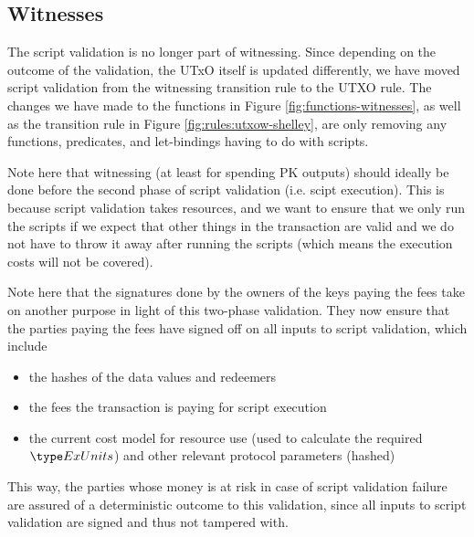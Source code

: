 \clearpage


\subsection{Witnesses}
\label{sec:witnesses-shelley}

The script validation is no longer part of witnessing. Since depending on
the outcome of the validation, the UTxO itself is updated differently, we
have moved script validation from the witnessing transition rule to
the UTXO rule. The changes we have made to the functions in Figure
\ref{fig:functions-witnesses}, as well as the transition rule in Figure
\ref{fig:rules:utxow-shelley}, are only removing any
functions, predicates, and let-bindings having to do with scripts.

Note here that witnessing (at least for spending PK outputs) should ideally
be done before the second phase of script validation (i.e. scipt execution).
This is because script validation takes resources, and we want to ensure
that we only run the scripts if we expect that other things in the transaction are
valid and we do not have to throw it away after running the scripts (which means
the execution costs will not be covered).

Note here that the signatures done by the owners of the keys paying the fees
take on another purpose in light of this two-phase validation.
They now ensure that the parties paying the fees have signed off on all
inputs to script validation, which include

\begin{itemize}
  \item the hashes of the data values and redeemers
  \item the fees the transaction is paying for script execution
  \item the current cost model for resource use (used to calculate
  the required $\ExUnits$) and other relevant protocol parameters (hashed)
\end{itemize}

This way, the parties whose money is at risk in case of script validation
failure are assured of a deterministic outcome to this validation, since
all inputs to script validation are signed and thus not tampered with.


